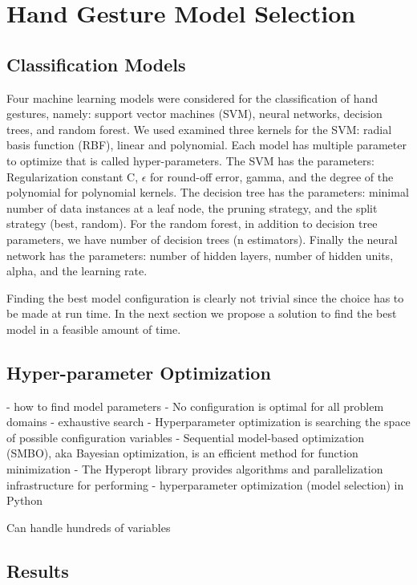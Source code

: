 \documentclass{article}
\begin{document}
\section{Hand Gesture Model Selection}

\subsection{Classification Models}

Four machine learning models were considered for the classification of hand gestures, namely: support vector machines (SVM), neural networks, decision trees, and random forest. We used examined three kernels for the SVM: radial basis function (RBF), linear and polynomial.
Each model has multiple parameter to optimize that is called hyper-parameters. The SVM has the parameters: Regularization constant C, $\epsilon$ for round-off error, gamma, and the degree of the polynomial for polynomial kernels. The decision tree has the parameters: minimal number of data instances at a leaf node, the pruning strategy, and the split strategy (best, random). For the random forest, in addition to decision tree parameters, we have number of decision trees (n estimators). Finally the neural network has the parameters:
number of hidden layers, number of hidden units, alpha, and the learning rate.

Finding the best model configuration is clearly not trivial since the choice has to be made at run time. In the next section we propose a solution to find the best model in a feasible amount of time.

\subsection{Hyper-parameter Optimization}
- how to find model parameters
- No configuration is optimal for all problem domains
- exhaustive search
- Hyperparameter optimization is searching the space of possible configuration variables
- Sequential model-based optimization (SMBO), aka Bayesian optimization, is an efficient method for function minimization
- The Hyperopt library provides algorithms and parallelization infrastructure for performing - hyperparameter optimization (model selection) in Python

Can handle hundreds of variables


\subsection{Results}
\end{document}
